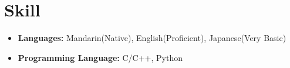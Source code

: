 \section{Skill}
\begin{itemize}
    \item \textbf{Languages:} Mandarin(Native), English(Proficient), Japanese(Very Basic)
    \item \textbf{Programming Language:} C/C++, Python
\end{itemize}